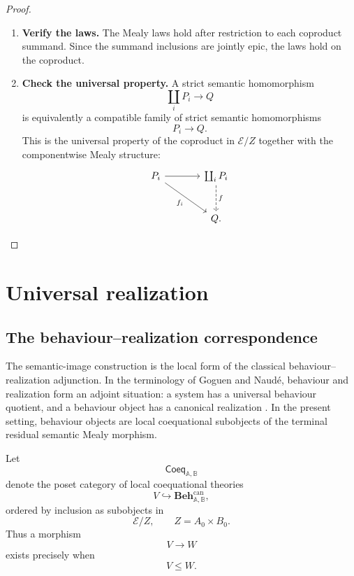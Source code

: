 \begin{proof}
\begin{enumerate}
        \item \textbf{Verify the laws.}
        The Mealy laws hold after restriction to each coproduct summand. Since
        the summand inclusions are jointly epic, the laws hold on the
        coproduct.

        \item \textbf{Check the universal property.}
        A strict semantic homomorphism
        \[
            \coprod_iP_i\to Q
        \]
        is equivalently a compatible family of strict semantic homomorphisms
        \[
            P_i\to Q.
        \]
        This is the universal property of the coproduct in \(\mathcal E/Z\)
        together with the componentwise Mealy structure:
        \[
        \begin{tikzcd}[column sep=large, row sep=large]
            P_i
                \arrow[r]
                \arrow[dr, "f_i"']
            &
            \coprod_iP_i
                \arrow[d, dashed, "f"]
            \\
            &
            Q .
        \end{tikzcd}
        \]
    \end{enumerate}
\end{proof}

\section{Universal realization}
\label{sec:universal-realization}

\subsection{The behaviour--realization correspondence}
\label{subsec:universal-realization-correspondence}

The semantic-image construction is the local form of the classical
behaviour--realization adjunction. In the terminology of Goguen and Naudé,
behaviour and realization form an adjoint situation: a system has a universal
behaviour quotient, and a behaviour object has a canonical realization
\cite{Goguen1973,Naude1977,Naude1979}. In the present setting, behaviour
objects are local coequational subobjects of the terminal residual semantic
Mealy morphism.

Let
\[
    \mathsf{Coeq}_{\mathbb A,\mathbb B}
\]
denote the poset category of local coequational theories
\[
    V\hookrightarrow
    \mathbf{Beh}^{\mathrm{can}}_{\mathbb A,\mathbb B},
\]
ordered by inclusion as subobjects in
\[
    \mathcal E/Z,
    \qquad
    Z=A_0\times B_0.
\]
Thus a morphism
\[
    V\to W
\]
exists precisely when
\[
    V\leq W.
\]

